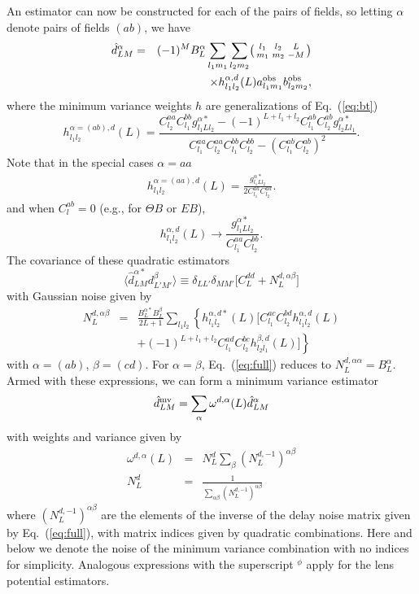 \documentclass[prd,amsmath,amssymb,floatfix,superscriptaddress,nofootinbib,twocolumn]{revtex4-1}
\def\be{\begin{equation}}
\def\ee{\end{equation}}
\def\bea{\begin{eqnarray}}
\def\eea{\end{eqnarray}}
\newcommand{\ec}[1]{Eq.~(\ref{eq:#1})}
\newcommand{\eql}[1]{\label{eq:#1}}
\begin{document}
An estimator can now be constructed for each of the pairs of fields, so letting $\alpha$ denote pairs of fields $(ab)$, we have
\bea
\hat{d}^{\alpha}_{LM} &=&\nonumber  (-1)^{M} B_{L}^{\alpha}\sum_{l_{1}m_{1}}\sum_{l_{2}m_{2}}\bigl(\begin{smallmatrix} l_1 & l_2 & L \\ m_1 & m_2 & -M  \end{smallmatrix}\bigr) \\
&& \times h^{\alpha,d}_{l_{1}l_{2}}(L) a^{\rm obs}_{l_{1}m_{1}}b^{\rm obs}_{l_{2}m_{2}} ,
\eea
where the minimum variance weights $h$ are generalizations of \ec{bt} 
\be
h^{\alpha=(ab),d}_{l_{1}l_{2}}(L) 
= \frac{C_{l_{2}}^{aa}C_{l_{1}}^{bb}g^{\alpha*}_{l_{1}Ll_{2}}-(-1)^{L+l_{1}+l_{2}}C_{l_{1}}^{ab}C_{l_{2}}^{ab}g^{\alpha*}_{l_{2}Ll_{1}}}{C_{l_{1}}^{aa}C_{l_{2}}^{aa}C_{l_{1}}^{bb}C_{l_{2}}^{bb}-(C_{l_{1}}^{ab}C_{l_{2}}^{ab})^{2}}.
\ee
Note that in the special cases $\alpha=aa$
\bea 
h_{l_{1}l_{2}}^{\alpha=(aa),d}(L)= \frac{g_{l_{1}Ll_{2}}^{\alpha*}}{2C_{l_{1}}^{aa}C_{l_{2}}^{aa}}. 
\eea 
and when $C_{l}^{ab}=0$ (e.g., for $\Theta B$ or $EB$),
\be
h^{\alpha,d}_{l_{1}l_{2}}(L) \rightarrow \frac{g^{\alpha *}_{l_{1}Ll_{2}}}{C_{l_{1}}^{aa}C_{l_{2}}^{bb}}. 
\ee
The covariance of these quadratic estimators
\be
\langle \hat{d}^{\alpha*}_{LM}d^{\beta}_{L'M'}\rangle \equiv \delta_{LL'}\delta_{MM'}\big[ C_{L}^{dd}+N_{L}^{d,\alpha \beta} \big]
\ee
with Gaussian noise given by
\bea
N_{L}^{d,\alpha\beta}&=&\frac{B_{L}^{\alpha*}B_{L}^{\beta}}{2L+1}\sum_{l_{1}l_{2}}  \left\{ h_{l_{1}l_{2}}^{\alpha,d*} (L)\big[ C_{l_{1}}^{ac}C_{l_{2}}^{bd}h_{l_{1}l_{2}}^{\alpha,d}(L)\right. \nonumber \\
&&\left. +(-1)^{L+l_{1}+l_{2}}C_{l_{1}}^{ad}C_{l_{2}}^{bc} h_{l_{2}l_{1}}^{\beta,d}(L)  \big]\right\} \eql{full} 
\eea
with $\alpha=(ab)$, $\beta=(cd)$. For $\alpha=\beta$, \ec{full} reduces to $N_{L}^{d,\alpha\alpha}=B_{L}^{\alpha}$.
Armed with these expressions, we can form a minimum variance estimator
\be
\hat{d}^{\rm mv}_{LM} = \sum_{\alpha}\omega^{d,\alpha}(L)\hat{d}^{\alpha}_{LM}  
\eql{dmvw}
\ee
with weights and variance given by
\bea
\omega^{d,\alpha}(L) & =&N^{d}_{L} \sum_{\beta}(N_{L}^{d,-1})^{\alpha \beta} \eql{weight} \nonumber\\
N^{d}_{L} &=& \frac{1}{\sum_{\alpha\beta} (N_{L}^{d,-1})^{\alpha \beta}}
\eea
where $(N_{L}^{d,-1})^{\alpha\beta}$ are the elements of the inverse of the delay noise matrix given by \ec{full}, with matrix indices given by quadratic combinations.  Here and below
we denote the noise of the minimum variance combination with no indices for simplicity.  Analogous expressions with the superscript $^\phi$ apply for the lens potential estimators.
\end{document}
